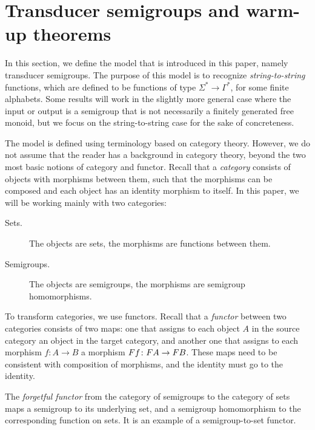 \section{Transducer semigroups and warm-up theorems}\label{sec:warm-up}

In this section, we define the model that is introduced in this paper, namely transducer semigroups. The purpose of this model is to recognize \emph{string-to-string} functions, which are defined to be functions of type $\Sigma^* \to \Gamma^*$, for some finite alphabets. Some results will work in the slightly more general case where the input or output is a semigroup that is not necessarily a finitely generated free monoid, but we focus on the string-to-string case for the sake of concreteness.

The model is defined using terminology based on category theory. However, we do not assume that the reader has a background in category theory, beyond the two most basic notions of category and functor. Recall that a \emph{category} consists of objects with morphisms between them, such that the morphisms can be composed and each object has an identity morphism to itself. In this paper, we will be working mainly with two categories:
\begin{description}
 \item[Sets.] The objects are sets, the morphisms are functions between them.
 \item[Semigroups.] The objects are semigroups, the morphisms are semigroup homomorphisms.
\end{description}
To transform categories, we use {functors}.
Recall that a \emph{functor} between two categories consists of two maps: one that assigns to each object $A$ in the source category an object in the target category, and another one that assigns to each morphism $f\colon A \to B$ a morphism $\functor f\colon \functor A \to \functor B$. These maps need to be consistent with composition of morphisms, and the identity must go to the identity.
\begin{example}\label{ex:forgetful}
    The \emph{forgetful functor} from the category of semigroups to the category of sets maps a semigroup to its underlying set, and a semigroup homomorphism to the corresponding function on sets. It is an example of a semigroup-to-set functor.
\end{example}
